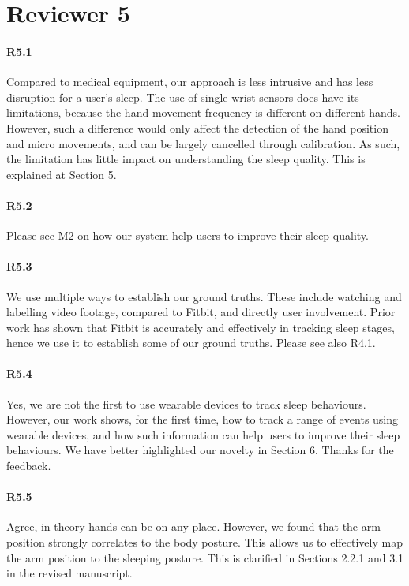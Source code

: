 \section*{Reviewer 5}

\paragraph{R5.1} Compared to medical equipment, our approach is less intrusive and has less disruption for a user's sleep. The use of
single wrist sensors does have its limitations, because the hand movement frequency is different on different hands. However, such a
difference would only affect the detection of the hand position and micro movements, and can be largely cancelled through calibration. As
such, the limitation has little impact on understanding the sleep quality. This is explained at Section 5.


\paragraph{R5.2} Please see M2 on how our system help users to improve their sleep quality.

\paragraph{R5.3} We use multiple ways to establish our ground truths. These include watching and labelling video footage, compared to
Fitbit, and directly user involvement. Prior work has shown that Fitbit is accurately and effectively in tracking sleep stages, hence we use it to
establish some of our ground truths. Please see also R4.1.

\paragraph{R5.4} Yes, we are not the first to use wearable devices to track sleep behaviours. However, our work shows, for the first time, how
 to track a range of events using wearable devices, and how such information can help users to improve
their sleep behaviours. We have better highlighted our novelty in Section 6. Thanks for the feedback.

\paragraph{R5.5} Agree, in theory hands can be on any place. However, we found that the arm position strongly correlates to the body
posture. This allows us to effectively map the arm position to the sleeping posture. This is clarified in Sections 2.2.1 and 3.1 in the
revised manuscript.

